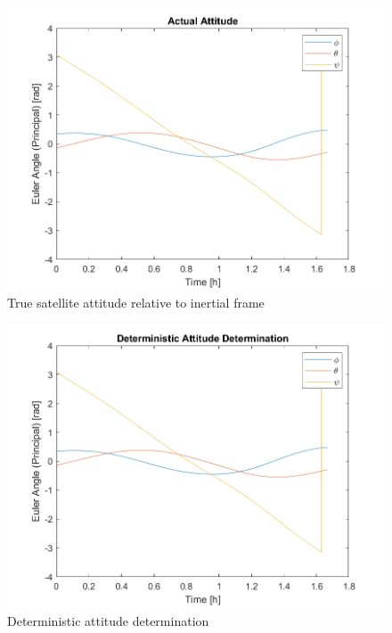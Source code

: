 \begin{figure}[H]
\centering
\includegraphics[scale=0.8]{Images/ps6_problem6_actual.png}
\caption{True satellite attitude relative to inertial frame}
\label{fig:Images/ps6_problem6_actual}
\end{figure}

\begin{figure}[H]
\centering
\includegraphics[scale=0.8]{Images/ps6_problem6_DAD.png}
\caption{Deterministic attitude determination}
\label{fig:Images/ps6_problem6_DAD}
\end{figure}


